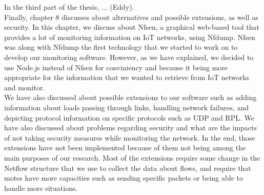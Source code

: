 In the third part of the thesis, ... (Eddy). \\ 

Finally, chapter 8 discusses about alternatives and possible extensions, as well as security. In this chapter, we discuss about Nfsen, a graphical web-based tool that provides a lot of monitoring information on IoT networks, using Nfdump. Nfsen was along with Nfdump the first technology that we started to work on to develop our monitoring software. However, as we have explained, we decided to use Node.js instead of Nfsen for conviniency and because it being more appropriate for the information that we wanted to retrieve from IoT networks and monitor. \\

We have also discussed about possible extensions to our software such as adding information about loads passing through links, handling network failures, and depicting protocol information on specific protocols such as UDP and RPL. We have also discussed about problems regarding security and what are the impacts of not taking security measures while monitoring the network. In the end, those extensions have not been implemented because of them not being among the main purposes of our research. Most of the extensions require some change in the Netflow structure that we use to collect the data about flows, and require that motes have more capacities such as sending specific packets or being able to handle more situations.\\




